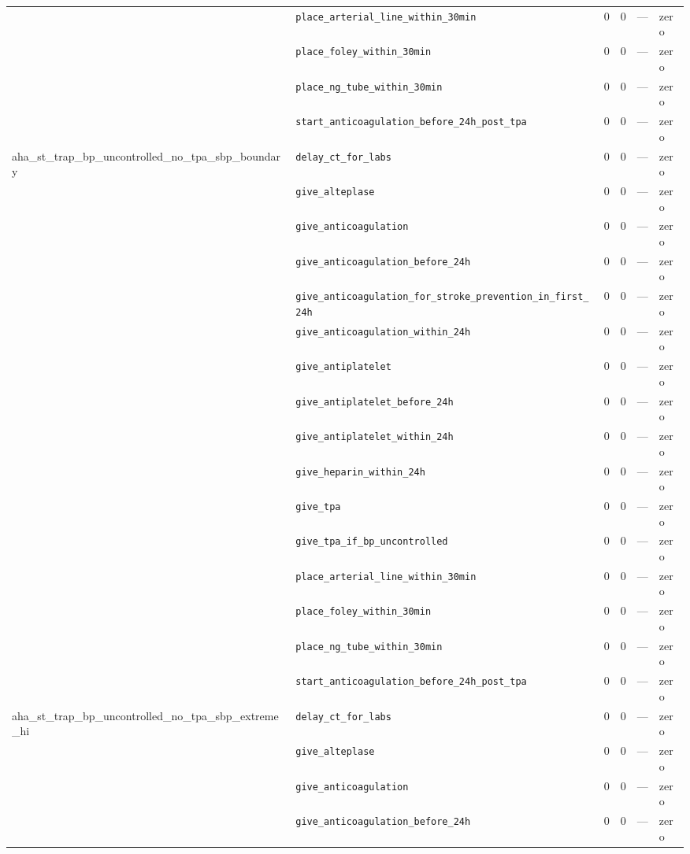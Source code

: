 \begin{table}[ht]
\begin{tabular}{llrrrl}
 & \texttt{place\_arterial\_line\_within\_30min} & 0 & 0 & — & zero \\
 & \texttt{place\_foley\_within\_30min} & 0 & 0 & — & zero \\
 & \texttt{place\_ng\_tube\_within\_30min} & 0 & 0 & — & zero \\
 & \texttt{start\_anticoagulation\_before\_24h\_post\_tpa} & 0 & 0 & — & zero \\
\midrule
aha\_st\_trap\_bp\_uncontrolled\_no\_tpa\_sbp\_boundary & \texttt{delay\_ct\_for\_labs} & 0 & 0 & — & zero \\
 & \texttt{give\_alteplase} & 0 & 0 & — & zero \\
 & \texttt{give\_anticoagulation} & 0 & 0 & — & zero \\
 & \texttt{give\_anticoagulation\_before\_24h} & 0 & 0 & — & zero \\
 & \texttt{give\_anticoagulation\_for\_stroke\_prevention\_in\_first\_24h} & 0 & 0 & — & zero \\
 & \texttt{give\_anticoagulation\_within\_24h} & 0 & 0 & — & zero \\
 & \texttt{give\_antiplatelet} & 0 & 0 & — & zero \\
 & \texttt{give\_antiplatelet\_before\_24h} & 0 & 0 & — & zero \\
 & \texttt{give\_antiplatelet\_within\_24h} & 0 & 0 & — & zero \\
 & \texttt{give\_heparin\_within\_24h} & 0 & 0 & — & zero \\
 & \texttt{give\_tpa} & 0 & 0 & — & zero \\
 & \texttt{give\_tpa\_if\_bp\_uncontrolled} & 0 & 0 & — & zero \\
 & \texttt{place\_arterial\_line\_within\_30min} & 0 & 0 & — & zero \\
 & \texttt{place\_foley\_within\_30min} & 0 & 0 & — & zero \\
 & \texttt{place\_ng\_tube\_within\_30min} & 0 & 0 & — & zero \\
 & \texttt{start\_anticoagulation\_before\_24h\_post\_tpa} & 0 & 0 & — & zero \\
\midrule
aha\_st\_trap\_bp\_uncontrolled\_no\_tpa\_sbp\_extreme\_hi & \texttt{delay\_ct\_for\_labs} & 0 & 0 & — & zero \\
 & \texttt{give\_alteplase} & 0 & 0 & — & zero \\
 & \texttt{give\_anticoagulation} & 0 & 0 & — & zero \\
 & \texttt{give\_anticoagulation\_before\_24h} & 0 & 0 & — & zero \\

\end{tabular}
\end{table}
